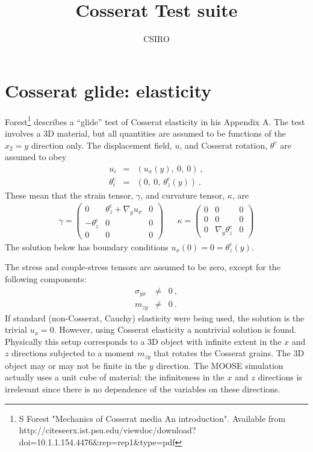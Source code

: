 \documentclass[]{scrreprt}
\newcommand{\thetac}{\theta^{\mathrm{c}}}
\begin{document}
\title{Cosserat Test suite}
\author{CSIRO}
\maketitle


\tableofcontents

\chapter{Cosserat glide: elasticity}

Forest\footnote{S Forest "Mechanics of Cosserat media An
  introduction".  Available from
  http://citeseerx.ist.psu.edu/viewdoc/download?doi=10.1.1.154.4476\&rep=rep1\&type=pdf}
describes a ``glide'' test of Cosserat elasticity in his Appendix A.
The test involves a 3D material, but all quantities are assumed to be
functions of the $x_{2} = y$ direction only.
The displacement field, $u$, and Cosserat rotation, $\thetac$
are assumed to obey
\begin{eqnarray}
u_{i} & = & (u_{x}(y),\ 0,\ 0) \ , \\
\thetac_{i} & = & (0,\ 0,\ \thetac_{z}(y)) \ .
\end{eqnarray}
These mean that the strain tensor, $\gamma$, and curvature tensor, $\kappa$, are
\begin{eqnarray}
\gamma = \left(
\begin{array}{ccc}
0 & \thetac_{z} + \nabla_{y}u_{x} & 0 \\
-\thetac_{z} & 0 & 0 \\
0 & 0 & 0
\end{array}
\right)
&&
\kappa = \left(
\begin{array}{ccc}
0 & 0 & 0 \\
0 & 0 & 0 \\
0 & \nabla_{y}\thetac_{z} & 0
\end{array}
\right)
\end{eqnarray}
The solution below has boundary conditions $u_{x}(0) = 0 =
\thetac_{z}(y)$.

The stress and couple-stress tensors are assumed to be zero, except for
the following components:
\begin{eqnarray}
\sigma_{yx} & \neq & 0 \ , \\
m_{zy} & \neq & 0 \ .
\end{eqnarray}
If standard (non-Cosserat, Cauchy) elasticity were being
used, the solution is the trivial $u_{x} = 0$.  However, using
Cosserat elasticity a nontrivial solution is found.
Physically this setup corresponds to a 3D object with infinite extent
in the $x$ and $z$ directions subjected to a moment $m_{zy}$ that
rotates the Cosserat grains.  The 3D object may or may not be finite
in the $y$ direction.  The MOOSE simulation actually uses a unit
cube of material: the infiniteness in the $x$ and $z$ directions
is irrelevant since there is no dependence of the variables on these
directions.
\end{document}
